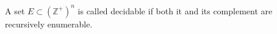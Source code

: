 A set $E \subset (\mathbb{Z}^+)^n$ is called decidable if both it and its complement are recursively enumerable.